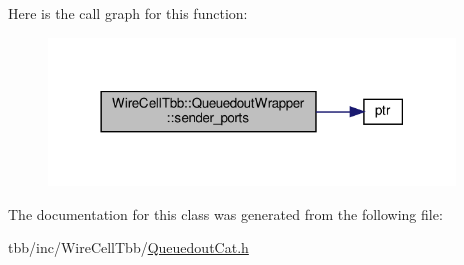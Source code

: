 Here is the call graph for this function\+:
\nopagebreak
\begin{figure}[H]
\begin{center}
\leavevmode
\includegraphics[width=306pt]{class_wire_cell_tbb_1_1_queuedout_wrapper_a3fbda43473c83b36b82fc53de70a9018_cgraph}
\end{center}
\end{figure}


The documentation for this class was generated from the following file\+:\begin{DoxyCompactItemize}
\item 
tbb/inc/\+Wire\+Cell\+Tbb/\hyperlink{_queuedout_cat_8h}{Queuedout\+Cat.\+h}\end{DoxyCompactItemize}
